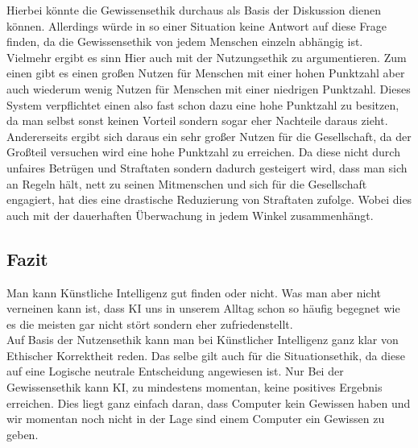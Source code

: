         Hierbei könnte die Gewissensethik durchaus als Basis der Diskussion dienen können. Allerdings würde in so einer Situation keine Antwort auf diese Frage finden, da die Gewissensethik von jedem Menschen einzeln abhängig ist.\\
        
        Vielmehr ergibt es sinn Hier auch mit der Nutzungsethik zu argumentieren. Zum einen gibt es einen großen Nutzen für Menschen mit einer hohen Punktzahl aber auch wiederum wenig Nutzen für Menschen mit einer niedrigen Punktzahl. Dieses System verpflichtet einen also fast schon dazu eine hohe Punktzahl zu besitzen, da man selbst sonst keinen Vorteil sondern sogar eher Nachteile daraus zieht.\\
        
        Andererseits ergibt sich daraus ein sehr großer Nutzen für die Gesellschaft, da der Großteil versuchen wird eine hohe Punktzahl zu erreichen. Da diese nicht durch unfaires Betrügen und Straftaten sondern dadurch gesteigert wird, dass man sich an Regeln hält, nett zu seinen Mitmenschen und sich für die Gesellschaft engagiert, hat dies eine drastische Reduzierung von Straftaten zufolge. Wobei dies auch mit der dauerhaften Überwachung in jedem Winkel zusammenhängt.
    
    \subsection{Fazit}
        Man kann Künstliche Intelligenz gut finden oder nicht. Was man aber nicht verneinen kann ist, dass KI uns in unserem Alltag schon so häufig begegnet wie es die meisten gar nicht stört sondern eher zufriedenstellt.\\
        
        Auf Basis der Nutzensethik kann man bei Künstlicher Intelligenz ganz klar von Ethischer Korrektheit reden. Das selbe gilt auch für die Situationsethik, da diese auf eine Logische neutrale Entscheidung angewiesen ist. Nur Bei der Gewissensethik kann KI, zu mindestens momentan, keine positives Ergebnis erreichen. Dies liegt ganz einfach daran, dass Computer kein Gewissen haben und wir momentan noch nicht in der Lage sind einem Computer ein Gewissen zu geben.